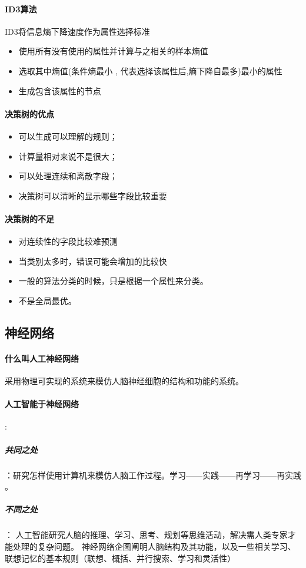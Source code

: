 \documentclass[UTF8,a4paper]{ctexart}
\begin{document}
\paragraph{ID3算法}ID3将信息熵下降速度作为属性选择标准

\begin{itemize}
	\item 使用所有没有使用的属性并计算与之相关的样本熵值
	\item 选取其中熵值(条件熵最小 , 代表选择该属性后,熵下降自最多)最小的属性
	\item 生成包含该属性的节点
\end{itemize}

\paragraph{决策树的优点}
\begin{itemize}
	\item 	可以生成可以理解的规则；
	\item 计算量相对来说不是很大；
	\item 可以处理连续和离散字段；
	\item 决策树可以清晰的显示哪些字段比较重要
\end{itemize}

\paragraph{决策树的不足}
\begin{itemize}
	\item 对连续性的字段比较难预测
	\item 当类别太多时，错误可能会增加的比较快
	\item 一般的算法分类的时候，只是根据一个属性来分类。
	\item 不是全局最优。
\end{itemize}

\subsection{神经网络}
\paragraph{什么叫人工神经网络}采用物理可实现的系统来模仿人脑神经细胞的结构和功能的系统。

\paragraph{人工智能于神经网络}:
\subparagraph{共同之处}：研究怎样使用计算机来模仿人脑工作过程。学习——实践——再学习——再实践 。
\subparagraph{不同之处}：
人工智能研究人脑的推理、学习、思考、规划等思维活动，解决需人类专家才能处理的复杂问题。
神经网络企图阐明人脑结构及其功能，以及一些相关学习、联想记忆的基本规则（联想、概括、并行搜索、学习和灵活性）
\end{document}
